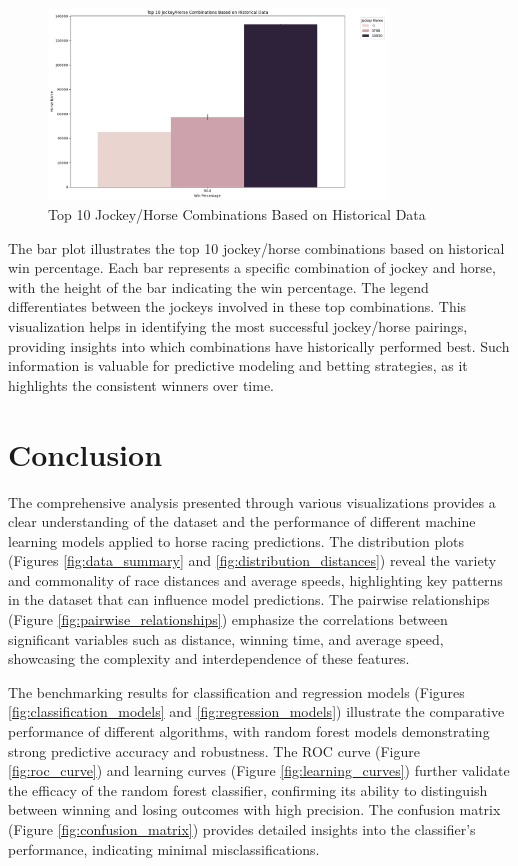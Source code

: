 \documentclass{article}
\begin{document}
\begin{figure}[H]
    \centering
    \includegraphics[width=0.8\textwidth]{images/top_jockey_horse_combinations.png} %
    \caption{Top 10 Jockey/Horse Combinations Based on Historical Data}
    \label{fig:top_jockey_horse_combinations}
\end{figure}

The bar plot illustrates the top 10 jockey/horse combinations based on historical win percentage. Each bar represents a specific combination of jockey and horse, with the height of the bar indicating the win percentage. The legend differentiates between the jockeys involved in these top combinations. This visualization helps in identifying the most successful jockey/horse pairings, providing insights into which combinations have historically performed best. Such information is valuable for predictive modeling and betting strategies, as it highlights the consistent winners over time.

\section{Conclusion}
The comprehensive analysis presented through various visualizations provides a clear understanding of the dataset and the performance of different machine learning models applied to horse racing predictions. The distribution plots (Figures \ref{fig:data_summary} and \ref{fig:distribution_distances}) reveal the variety and commonality of race distances and average speeds, highlighting key patterns in the dataset that can influence model predictions. The pairwise relationships (Figure \ref{fig:pairwise_relationships}) emphasize the correlations between significant variables such as distance, winning time, and average speed, showcasing the complexity and interdependence of these features.

The benchmarking results for classification and regression models (Figures \ref{fig:classification_models} and \ref{fig:regression_models}) illustrate the comparative performance of different algorithms, with random forest models demonstrating strong predictive accuracy and robustness. The ROC curve (Figure \ref{fig:roc_curve}) and learning curves (Figure \ref{fig:learning_curves}) further validate the efficacy of the random forest classifier, confirming its ability to distinguish between winning and losing outcomes with high precision. The confusion matrix (Figure \ref{fig:confusion_matrix}) provides detailed insights into the classifier's performance, indicating minimal misclassifications.
\end{document}
